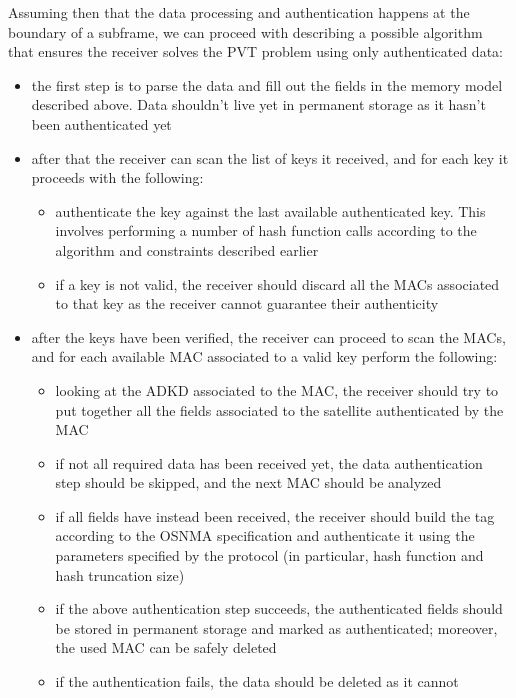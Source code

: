 Assuming then that the data processing and authentication happens at the
boundary of a subframe, we can proceed with describing a possible algorithm that
ensures the receiver solves the PVT problem using only authenticated data:
\begin{itemize}
  \item the first step is to parse the data and fill out the fields in the
    memory model described above. Data shouldn't live yet in permanent storage
    as it hasn't been authenticated yet
  \item after that the receiver can scan the list of keys it received, and for
    each key it proceeds with the following:
    \begin{itemize}
      \item authenticate the key against the last available authenticated key.
        This involves performing a number of hash function calls according to
        the algorithm and constraints described earlier
      \item if a key is not valid, the receiver should discard all the MACs
        associated to that key as the receiver cannot guarantee their
        authenticity
    \end{itemize}
  \item after the keys have been verified, the receiver can proceed to scan the
    MACs, and for each available MAC associated to a valid key perform the
    following:
    \begin{itemize}
      \item looking at the ADKD associated to the MAC, the receiver should try
        to put together all the fields associated to the satellite authenticated
        by the MAC
      \item if not all required data has been received yet, the data
        authentication step should be skipped, and the next MAC should be
        analyzed
      \item if all fields have instead been received, the receiver should build
        the tag according to the OSNMA specification and authenticate it using
        the parameters specified by the protocol (in particular, hash function
        and hash truncation size)
      \item if the above authentication step succeeds, the authenticated fields
        should be stored in permanent storage and marked as authenticated;
        moreover, the used MAC can be safely deleted
      \item if the authentication fails, the data should be deleted as it cannot

\end{itemize}
\end{itemize}

